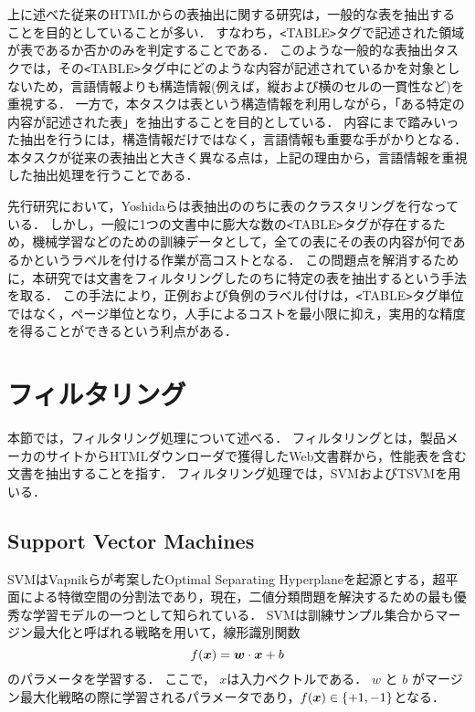 上に述べた従来のHTMLからの表抽出に関する研究は，一般的な表を抽出することを目的としていることが多い．
すなわち，\verb+<+TABLE\verb+>+タグで記述された領域が表であるか否かのみを判定することである．
このような一般的な表抽出タスクでは，その\verb+<+TABLE\verb+>+タグ中にどのような内容が記述されているかを対象としないため，言語情報よりも構造情報(例えば，縦および横のセルの一貫性など)を重視する．
一方で，本タスクは表という構造情報を利用しながら，「ある特定の内容が記述された表」を抽出することを目的としている．
内容にまで踏みいった抽出を行うには，構造情報だけではなく，言語情報も重要な手がかりとなる．
本タスクが従来の表抽出と大きく異なる点は，上記の理由から，言語情報を重視した抽出処理を行うことである．

先行研究において，Yoshidaら\cite{yoshida}は表抽出ののちに表のクラスタリングを行なっている．
しかし，一般に1つの文書中に膨大な数の\verb+<+TABLE\verb+>+タグが存在するため，機械学習などのための訓練データとして，全ての表にその表の内容が何であるかというラベルを付ける作業が高コストとなる．
この問題点を解消するために，本研究では文書をフィルタリングしたのちに特定の表を抽出するという手法を取る．
この手法により，正例および負例のラベル付けは，\verb+<+TABLE\verb+>+タグ単位ではなく，ページ単位となり，人手によるコストを最小限に抑え，実用的な精度を得ることができるという利点がある．

\section{フィルタリング}
本節では，フィルタリング処理について述べる．
フィルタリングとは，製品メーカのサイトからHTMLダウンローダで獲得したWeb文書群から，性能表を含む文書を抽出することを指す．
フィルタリング処理では，SVMおよびTSVMを用いる．

\subsection{Support Vector Machines}
SVMはVapnikらが考案したOptimal Separating Hyperplaneを起源とする，超平面による特徴空間の分割法であり，現在，二値分類問題を解決するための最も優秀な学習モデルの一つとして知られている\cite{vapnik}．
SVMは訓練サンプル集合からマージン最大化と呼ばれる戦略を用いて，線形識別関数
\begin{equation}
f(\mbox{\boldmath $x$})=\mbox{\boldmath $w$} \cdot \mbox{\boldmath $x$} + b
\end{equation}
のパラメータを学習する．
ここで， \mbox{\boldmath $x$}は入力ベクトルである．
\mbox{\boldmath $w$} と $b$ がマージン最大化戦略の際に学習されるパラメータであり，$f(\mbox{\boldmath $x$}) \in \{+1,-1\}$となる．

